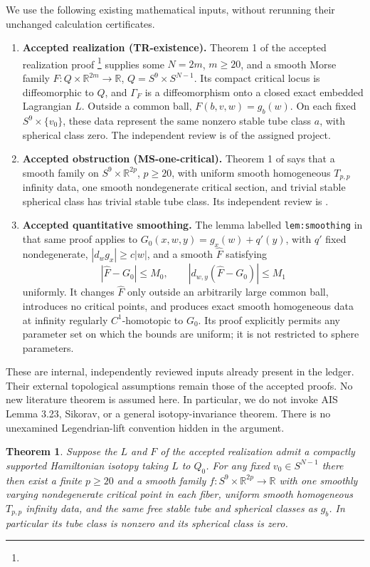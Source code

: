 \documentclass[11pt]{article}
\newtheorem{theorem}{Theorem}
\newcommand{\R}{\mathbb R}
\begin{document}
We use the following existing mathematical inputs, without rerunning
their unchanged calculation certificates.
\begin{enumerate}
\item \textbf{Accepted realization (TR-existence).}
Theorem 1 of the accepted realization proof%
\footnote{}
supplies some \(N=2m\), \(m\geq20\), and a smooth Morse family
\(F:Q\times\R^{2m}\to\R\), \(Q=S^9\times S^{N-1}\).
Its compact critical locus is diffeomorphic to \(Q\), and
\(\Gamma_F\) is a diffeomorphism onto a closed exact embedded
Lagrangian \(L\). Outside a common ball, \(F(b,v,w)=g_b(w)\).
On each fixed \(S^9\times\{v_0\}\), these data represent the same
nonzero stable tube class \(a\), with spherical class zero.
The independent review is
 of the assigned project.
\item \textbf{Accepted obstruction (MS-one-critical).}
Theorem 1 of 
says that a smooth family on \(S^9\times\R^{2p}\), \(p\geq20\),
with uniform smooth homogeneous \(T_{p,p}\) infinity data, one
smooth nondegenerate critical section, and trivial stable spherical
class has trivial stable tube class.
Its independent review is
.
\item \textbf{Accepted quantitative smoothing.}
The lemma labelled \texttt{lem:smoothing} in that same proof applies
to \(G_0(x,w,y)=g_x(w)+q'(y)\), with \(q'\) fixed nondegenerate,
\(|d_wg_x|\geq c|w|\), and a smooth \(\widehat F\) satisfying
\[
 |\widehat F-G_0|\leq M_0,\qquad
 |d_{w,y}(\widehat F-G_0)|\leq M_1
 \tag{2}
 \]
uniformly. It changes \(\widehat F\) only outside an arbitrarily
large common ball, introduces no critical points, and produces
exact smooth homogeneous data at infinity regularly \(C^1\)-homotopic
to \(G_0\). Its proof explicitly permits any parameter set on which
the bounds are uniform; it is not restricted to sphere parameters.
\end{enumerate}
These are internal, independently reviewed inputs already present in
the ledger. Their external topological assumptions remain those of
the accepted proofs. No new literature theorem is assumed here.
In particular, we do not invoke AIS Lemma 3.23, Sikorav, or a general
isotopy-invariance theorem. There is no unexamined Legendrian-lift
convention hidden in the argument.

\begin{theorem}\label{thm:transport}
Suppose the \(L\) and \(F\) of the accepted realization admit a
compactly supported Hamiltonian isotopy taking \(L\) to \(Q_0\).
For any fixed \(v_0\in S^{N-1}\) there then exist a finite
\(p\geq20\) and a smooth family \(f:S^9\times\R^{2p}\to\R\)
with one smoothly varying nondegenerate critical point in each
fiber, uniform smooth homogeneous \(T_{p,p}\) infinity data,
and the same free stable tube and spherical classes as \(g_b\).
In particular its tube class is nonzero and its spherical class is zero.
\end{theorem}
\end{document}
